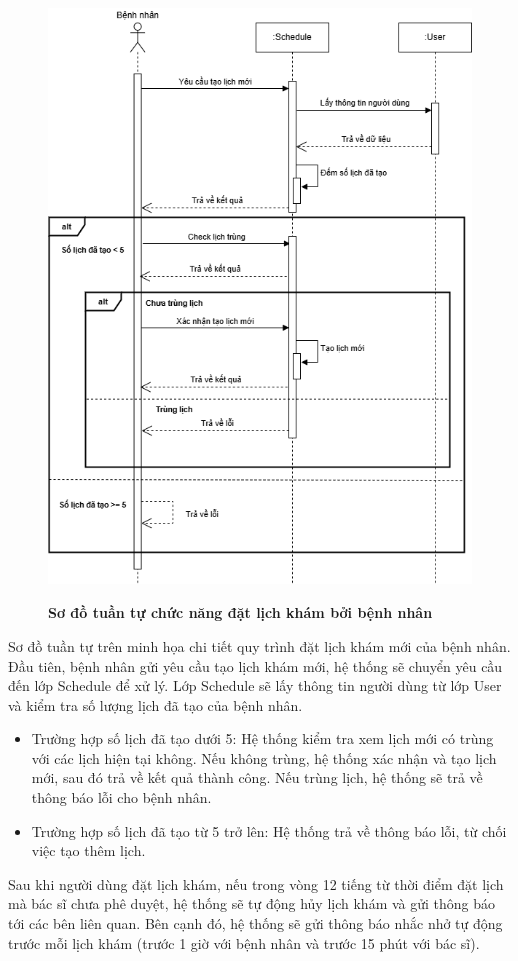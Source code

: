 \begin{figure}[H]
	\centering
	\includegraphics[width=12.8cm,height=16cm]{Images/sequence/schedule/createByPatient.drawio.png}
	\caption[Sơ đồ tuần tự chức năng đặt lịch khám bởi bệnh nhân]{\bfseries \fontsize{12pt}{0pt}
		\selectfont Sơ đồ tuần tự chức năng đặt lịch khám bởi bệnh nhân}
	\label{sequence_create_by_patient} %
\end{figure}
Sơ đồ tuần tự trên minh họa chi tiết quy trình đặt lịch khám mới của bệnh nhân. Đầu tiên, bệnh nhân gửi yêu cầu tạo lịch khám mới, hệ thống sẽ chuyển yêu cầu đến lớp Schedule để xử lý.
Lớp Schedule sẽ lấy thông tin người dùng từ lớp User và kiểm tra số lượng lịch đã tạo của bệnh nhân.
\setlength{\itemsep}{0pt}
\setlength{\parskip}{0pt}
\begin{itemize}
	\item Trường hợp số lịch đã tạo dưới 5: Hệ thống kiểm tra xem lịch mới có trùng với các lịch hiện tại không. Nếu không trùng, hệ thống xác nhận và tạo lịch mới, sau đó trả về kết quả thành công. Nếu trùng lịch, hệ thống sẽ trả về thông báo lỗi cho bệnh nhân.
	\item Trường hợp số lịch đã tạo từ 5 trở lên: Hệ thống trả về thông báo lỗi, từ chối việc tạo thêm lịch.
\end{itemize}
Sau khi người dùng đặt lịch khám, nếu trong vòng 12 tiếng từ thời điểm đặt lịch mà bác sĩ chưa phê duyệt, hệ thống sẽ tự động hủy lịch khám và gửi thông báo tới các bên liên quan. Bên cạnh đó, hệ thống sẽ gửi thông báo nhắc nhở tự động trước mỗi lịch khám
(trước 1 giờ với bệnh nhân và trước 15 phút với bác sĩ).

